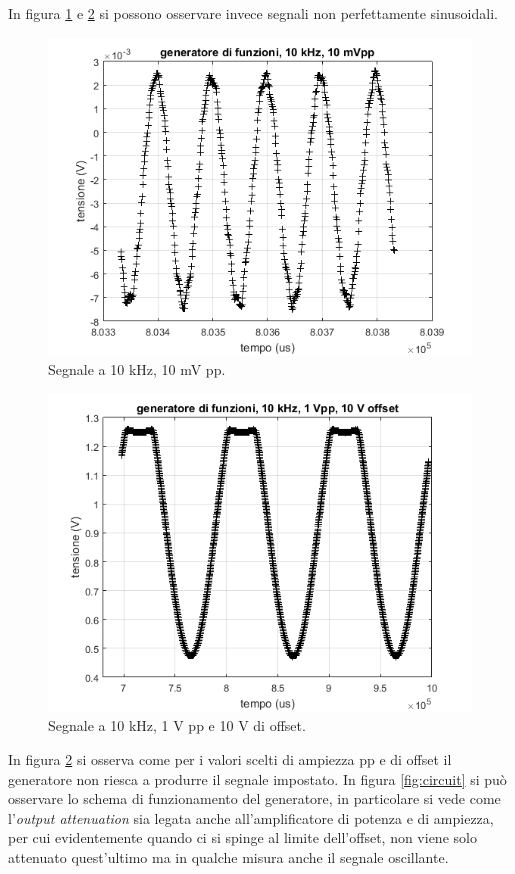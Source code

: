 \documentclass[journal, a4paper]{IEEEtran}
\begin{document}
In figura \ref{fig:prova_gen_10khz_10mpp} e \ref{fig:sballato} si possono osservare invece segnali non perfettamente sinusoidali.

\begin{figure}[htp]
\centering
\includegraphics[scale=.4]{prova_gen_10khz_10mpp}
\caption{Segnale a 10 kHz, 10 mV pp.}
\label{fig:prova_gen_10khz_10mpp}
\end{figure}

\begin{figure}[htp]
\centering
\includegraphics[scale=.4]{sballato}
\caption{Segnale a 10 kHz, 1 V pp e 10 V di offset.}
\label{fig:sballato}
\end{figure}


In figura \ref{fig:sballato} si osserva come per i valori scelti di ampiezza pp e di offset il generatore non riesca a produrre il segnale impostato. In figura \ref{fig:circuit} si può osservare lo schema di funzionamento del generatore, in particolare si vede come l'\textit{output attenuation} sia legata anche all'amplificatore di potenza e di ampiezza, per cui evidentemente quando ci si spinge al limite dell'offset, non viene solo attenuato quest'ultimo ma in qualche misura anche il segnale oscillante.
\end{document}

